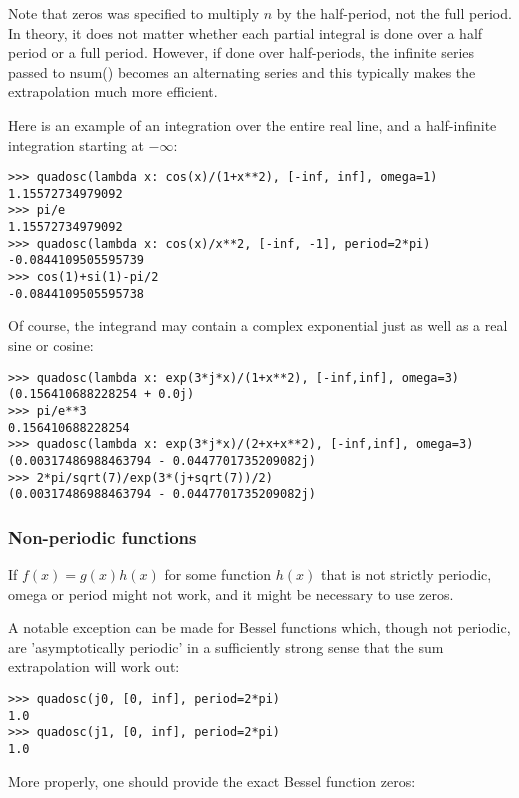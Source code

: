 Note that zeros was specified to multiply $n$ by the half-period, not the full period. In theory, it does not matter whether each partial integral is done over a half period or a full period. However, if done over half-periods, the infinite series passed to nsum() becomes an alternating series and this typically makes the extrapolation much more efficient.

Here is an example of an integration over the entire real line, and a half-infinite integration starting at $-\infty$:

\begin{lstlisting}
>>> quadosc(lambda x: cos(x)/(1+x**2), [-inf, inf], omega=1)
1.15572734979092
>>> pi/e
1.15572734979092
>>> quadosc(lambda x: cos(x)/x**2, [-inf, -1], period=2*pi)
-0.0844109505595739
>>> cos(1)+si(1)-pi/2
-0.0844109505595738
\end{lstlisting}

Of course, the integrand may contain a complex exponential just as well as a real sine or cosine:

\begin{lstlisting}
>>> quadosc(lambda x: exp(3*j*x)/(1+x**2), [-inf,inf], omega=3)
(0.156410688228254 + 0.0j)
>>> pi/e**3
0.156410688228254
>>> quadosc(lambda x: exp(3*j*x)/(2+x+x**2), [-inf,inf], omega=3)
(0.00317486988463794 - 0.0447701735209082j)
>>> 2*pi/sqrt(7)/exp(3*(j+sqrt(7))/2)
(0.00317486988463794 - 0.0447701735209082j)
\end{lstlisting}



\subsubsection{Non-periodic functions}

If $f(x)=g(x) h(x)$ for some function $h(x)$ that is not strictly periodic, omega or period might not work, and it might be necessary to use zeros.

A notable exception can be made for Bessel functions which, though not periodic, are 'asymptotically periodic' in a sufficiently strong sense that the sum extrapolation will work out:

\begin{lstlisting}
>>> quadosc(j0, [0, inf], period=2*pi)
1.0
>>> quadosc(j1, [0, inf], period=2*pi)
1.0
\end{lstlisting}

More properly, one should provide the exact Bessel function zeros:

